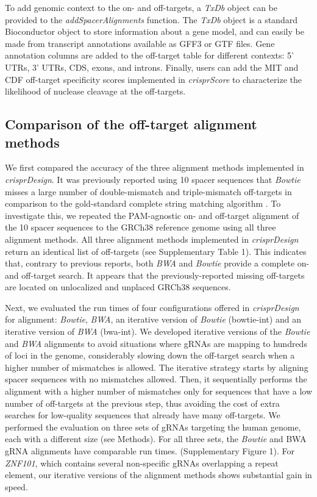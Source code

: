 \documentclass[pdftex,english,10pt]{article}
\begin{document}
To add genomic context to the on- and off-targets, a \textit{TxDb} object can be provided to the \textit{addSpacerAlignments} function. 
The \textit{TxDb} object is a standard Bioconductor object to store information about a gene model, and can easily be made from transcript annotations available as GFF3 or GTF files. Gene annotation columns are added to the off-target table for different contexts: 5' UTRs, 3' UTRs, CDS, exons, and introns. Finally, users can add the MIT and CDF off-target specificity scores \citep{mit, azimuth} implemented in \textit{crisprScore} to characterize the likelihood of nuclease cleavage at the off-targets. 






\subsection*{Comparison of the off-target alignment methods}


We first compared the accuracy of the three alignment methods implemented in \textit{crisprDesign}. It was previously reported using 10 spacer sequences that \textit{Bowtie} misses a large number of double-mismatch and triple-mismatch off-targets in comparison to the gold-standard complete string matching algorithm \citep{multicrispr}.
To investigate this, we repeated the PAM-agnostic on- and off-target alignment of the 10 spacer sequences to the GRCh38 reference genome using all three alignment methods. All three alignment methods implemented in \textit{crisprDesign} return an identical list of off-targets (see Supplementary Table 1). This indicates that, contrary to previous reports, both \textit{BWA} and \textit{Bowtie} provide a complete on- and off-target search. It appears that the previously-reported missing off-targets are located on unlocalized and unplaced GRCh38 sequences.

Next, we evaluated the run times of four configurations offered in \textit{crisprDesign} for alignment: \textit{Bowtie}, \textit{BWA}, an iterative version of \textit{Bowtie} (bowtie-int) and an iterative version of \textit{BWA} (bwa-int). We developed iterative versions of the \textit{Bowtie} and \textit{BWA} alignments to avoid situations where gRNAs are mapping to hundreds of loci in the genome, considerably slowing down the off-target search when a higher number of mismatches is allowed.  The iterative strategy starts by aligning spacer sequences with no mismatches allowed. Then, it sequentially performs the alignment with a higher number of mismatches only for sequences that have a low number of off-targets at the previous step, thus avoiding the cost of extra searches for low-quality sequences that already have many off-targets.  We performed the evaluation on three sets of gRNAs targeting the human genome, each with a different size (see Methods).  For all three sets, the \textit{Bowtie} and BWA gRNA alignments have comparable run times. (Supplementary Figure 1). For \textit{ZNF101}, which contains several non-specific gRNAs overlapping a repeat element, our iterative versions of the alignment methods shows substantial gain in speed. 
\end{document}
